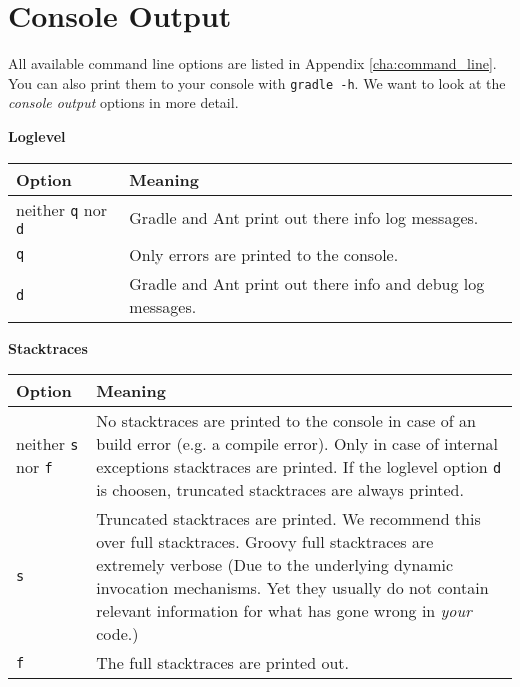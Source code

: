 \section{Console Output}
All available command line options are listed in Appendix \ref{cha:command_line}. You can also print them to your console with \texttt{gradle -h}. We want to look at the \emph{console output} options in more detail. 
\\

\centerline{\textbf{Loglevel}}
\medskip

\begin{tabular}{|l|l|} \hline
Option & Meaning  \\ \hline
neither \texttt{q} nor \texttt{d} & Gradle and Ant print out there info log messages.  \\ \hline
\texttt{q} & Only errors are printed to the console.  \\ \hline
\texttt{d} & Gradle and Ant print out there info and debug log messages. \\ \hline
\end{tabular}
\medskip

\centerline{\textbf{Stacktraces}}
\medskip

\begin{tabular}{|l|p{15cm}|} \hline
Option & Meaning  \\ \hline
neither \texttt{s} nor \texttt{f} & No stacktraces are printed to the console in case of an build error (e.g. a compile error). Only in case of internal exceptions stacktraces are printed. If the loglevel option \texttt{d} is choosen, truncated stacktraces are always printed. \\ \hline
\texttt{s} & Truncated stacktraces are printed. We recommend this over full stacktraces. Groovy full stacktraces are extremely verbose (Due to the underlying dynamic invocation mechanisms. Yet they usually do not contain relevant information for what has gone wrong in \emph{your} code.)  \\ \hline
\texttt{f} & The full stacktraces are printed out. \\ \hline
\end{tabular}

